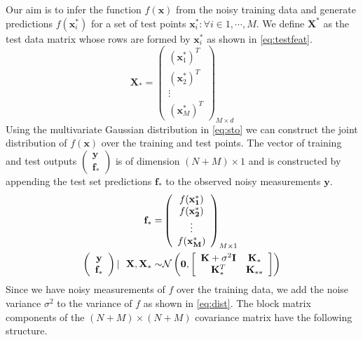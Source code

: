 Our aim is to infer the function $f(\mathbf{x})$ from the noisy training data and generate 
predictions $f(\mathbf{x}^{*}_i)$ for a set of test points 
${\mathbf{x}^{*}_i : \forall i \in 1, \cdots, M}$. We define $\mathbf{X}^*$ as the test data 
matrix whose rows are formed by $\mathbf{x}^{*}_i$ as shown in \cref{eq:testfeat}. 
%
\begin{equation}
    \mathbf{X}_* = \left( \begin{array}{c} (\mathbf{x}^{*}_1)^T \\ (\mathbf{x}^{*}_2)^T \\ \vdots \\ (\mathbf{x}^{*}_M)^T \end{array} \right)_{M \times d} \label{eq:testfeat} 
\end{equation}
%
Using the multivariate Gaussian distribution in \cref{eq:sto} we can construct the joint 
distribution of $f(\mathbf{x})$ over the training and test points. The vector of training and test 
outputs $\left( \begin{array}{c} \mathbf{y} \\ \mathbf{f_*} \end{array} \right)$ is of dimension 
$(N+M) \times 1$ and is constructed by appending the test set predictions $\mathbf{f}_*$ to the 
observed noisy measurements $\mathbf{y}$.
%
\begin{align}
    \mathbf{f}_* = & \left( \begin{array}{c} f(\mathbf{x^{*}_1}) \\ f(\mathbf{x^{*}_2}) \\ \vdots \\ f(\mathbf{x^{*}_M}) \end{array} \right)_{M \times 1} \\
     \vspace{4\baselineskip}
    \left( \begin{array}{c} \mathbf{y} \\ \mathbf{f_*} \end{array} \right) | \ \ \mathbf{X}, \mathbf{X}_* \sim & 
    \mathcal{N}\left(\mathbf{0}, \left[ \begin{array}{cc} \mathbf{K} + \sigma^{2} \mathbf{I} & \mathbf{K}_{*} \\ \mathbf{K}_{*}^T & \mathbf{K}_{**} \end{array} \right ] \right) \label{eq:dist}
\end{align}
%
Since we have noisy measurements of $f$ over the training data, we add the noise variance 
$\sigma^2$ to the variance of $f$ as shown in \cref{eq:dist}. The block matrix components of the 
$(N+M) \times (N+M)$ covariance matrix have the following structure.

